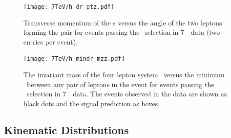  \begin{figure}[htbp]
 \begin{center}
  \texttt{[image: 7TeV/h\_dr\_ptz.pdf]}\hfill
  \caption[Transverse momentum of the \leppair s versus the angle of the two leptons
    forming the pair for events passing the \ZZs\ selection in 7~\tev\ data.]
    {\small Transverse momentum of the \leppair s versus the angle of the two leptons
    forming the pair for events passing the \ZZs\ selection in 7~\tev\ data (two
    entries per event).}
 \label{fig:zzdists-7teV-dr-ptz1}
 \end{center}
 \end{figure}

 \begin{figure}[htbp]
 \begin{center}
  \texttt{[image: 7TeV/h\_mindr\_mzz.pdf]}\hfill
  \caption[The invariant mass of the four lepton system \mZZ\ versus the
    minimum \deltaR\ between any pair of leptons in the event for events passing
    the \ZZs\ selection in 7~\tev\ data.]
    {\small The invariant mass of the four lepton system \mZZ\ versus the
    minimum \deltaR\ between any pair of leptons in the event for events passing
    the \ZZs\ selection in 7~\tev\ data.
    The events observed in the data are shown as black dots and the signal prediction as boxes.}
 \label{fig:zzdists-7teV-dr-ptz1}
 \end{center}
 \end{figure}

\subsection{Kinematic Distributions}

